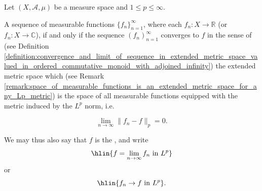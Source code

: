 \begin{definition} \label{definition:sequence_of_measurable_functions_on_a_measure_space_that_converges_to_a_function_in_the_L_p_norm}
    Let \((X, \mathcal{A}, \mu)\) be a measure space and \(1 \leq p \leq \infty\). 
    
    A sequence of measurable functions \(\{f_n\}_{n=1}^\infty\), where each \(f_n : X \to \mathbb{R}\) (or \(f_n : X \to \mathbb{C}\)),  if and only if the sequence $(f_n)_{n=1}^\infty$ converges to $f$ in the sense of (see Definition \ref{definition:convergence_and_limit_of_sequence_in_extended_metric_space_valued_in_ordered_commutative_monoid_with_adjoined_infinity}) the extended metric space which (see Remark \ref{remark:space_of_measurable_functions_is_an_extended_metric_space_for_any_Lp_metric}) is the space of all measurable functions equipped with the metric induced by the $L^p$ norm, i.e. 

    \[ \lim_{n \to \infty} \|f_n - f\|_p = 0. \]

    We may thus also say that $f$ is the , and write 
    $$\hlin{f = \lim_{n \to \infty} f_n \text{ in } L^p}$$
    or 
    $$\hlin{f_n \to f \text{ in } L^p}.$$
\end{definition}